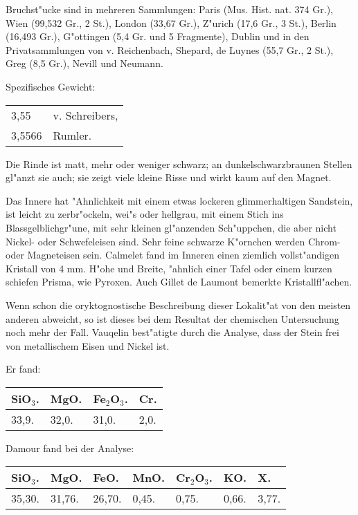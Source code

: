 \documentclass[a4paper, 11pt, oneside]{article}
\begin{document}
Bruchst"ucke sind in mehreren Sammlungen: Paris (Mus. Hist. nat. 374 Gr.), Wien (99,532 Gr., 2 St.), London (33,67 Gr.), Z"urich (17,6 Gr., 3 St.), Berlin (16,493 Gr.), G"ottingen (5,4 Gr. und 5 Fragmente), Dublin und in den Privatsammlungen von v. Reichenbach, Shepard, de Luynes (55,7 Gr., 2 St.), Greg (8,5 Gr.), Nevill und Neumann.

Spezifisches Gewicht:
\begin{table}[!ht]
    \centering\swabfamily\Large
    \begin{tabular}{l l}
        3,55 & v. Schreibers,\\
        3,5566 & Rumler.
    \end{tabular}
\end{table}

Die Rinde ist matt, mehr oder weniger schwarz; an dunkelschwarzbraunen Stellen gl"anzt sie auch; sie zeigt viele kleine Risse und wirkt kaum auf den Magnet.

Das Innere hat "Ahnlichkeit mit einem etwas lockeren glimmerhaltigen Sandstein, ist leicht zu zerbr"ockeln, wei"s oder hellgrau, mit einem Stich ins Blassgelblichgr"une, mit sehr kleinen gl"anzenden Sch"uppchen, die aber nicht Nickel- oder Schwefeleisen sind. Sehr feine schwarze K"ornchen werden Chrom- oder Magneteisen sein. Calmelet fand im Inneren einen ziemlich vollst"andigen Kristall von 4 mm. H"ohe und Breite, "ahnlich einer Tafel oder einem kurzen schiefen Prisma, wie Pyroxen. Auch Gillet de Laumont bemerkte Kristallfl"achen.

Wenn schon die oryktognostische Beschreibung dieser Lokalit"at von den meisten anderen abweicht, so ist dieses bei dem Resultat der chemischen Untersuchung noch mehr der Fall. Vauqelin best"atigte durch die Analyse, dass der Stein frei von metallischem Eisen und Nickel ist.

Er fand:
\begin{table}[!ht]
    \centering\swabfamily\Large
    \begin{tabular}{l l l l}
        SiO$_{3}$. & MgO. & Fe$_{2}$O$_{3}$. & Cr. \\ \hline
        33,9. & 32,0. & 31,0. & 2,0. \\
    \end{tabular}
\end{table}

Damour fand bei der Analyse:
\begin{table}[!ht]
    \centering\swabfamily\Large
    \begin{tabular}{l l l l l l l}
        SiO$_{3}$. & MgO. & FeO. & MnO. & Cr$_{2}$O$_{3}$. & KO. & X. \\ \hline
        35,30. & 31,76. & 26,70. & 0,45. & 0,75. & 0,66. & 3,77. \\
    \end{tabular}
\end{table}
\end{document}
